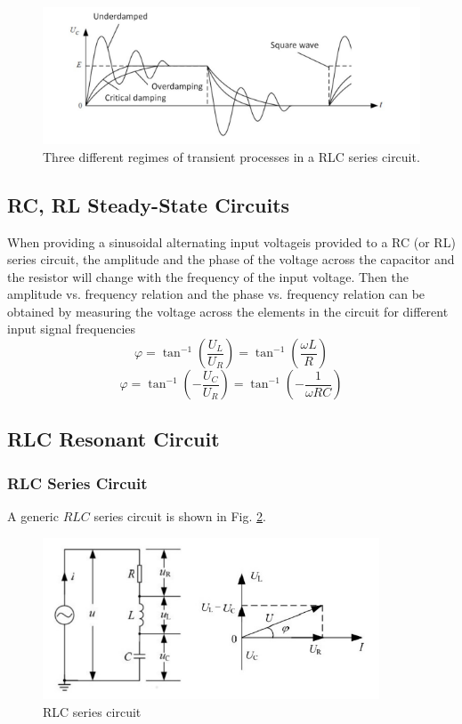 \documentclass[a4paper]{article}
\begin{document}
\begin{figure}[!htbp]
	\centering
	\includegraphics[width=12cm]{regimes.png}
	\caption{Three different regimes of transient processes in a RLC series circuit.}
	\label{fig::regimes}
\end{figure}

\subsection{RC, RL Steady-State Circuits}

When providing a sinusoidal alternating input voltageis provided to a RC (or RL) series circuit, the amplitude and the phase of the voltage across the capacitor and the resistor will change with the frequency of the input voltage. Then the amplitude vs. frequency relation and the phase vs. frequency relation can be obtained by measuring the voltage across the elements in the circuit for different input signal frequencies
$$\varphi = \tan^{-1}(\frac{U_L}{U_R}) = \tan^{-1}(\frac{\omega L}{R})$$
$$\varphi = \tan^{-1}(-\frac{U_C}{U_R}) = \tan^{-1}(-\frac{1}{\omega RC})$$
\subsection{RLC Resonant Circuit}
\subsubsection{RLC Series Circuit}
A generic $RLC$ series circuit is shown in Fig. \ref{fig::RLC}.

\begin{figure}[!htbp]
	\center
	\includegraphics[width=10cm]{RLC.png}
	\caption{RLC series circuit}
	\label{fig::RLC}
\end{figure}
\end{document}
